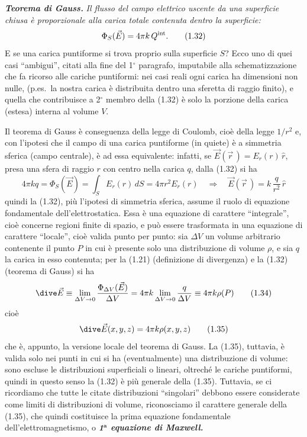 \textbf{\textit{Teorema di Gauss.}} \textit{Il flusso del campo elettrico uscente da una superficie chiusa è proporzionale alla carica totale contenuta dentro la superficie:}
\begin{equation}
\Phi_S(\vec E)=4\pi k\,Q^{\rm int}.
\tag{1.32}
\end{equation}
E se una carica puntiforme si trova proprio sulla superficie $S$? Ecco uno di quei casi ``ambigui'', citati alla fine del 1$^\circ$ paragrafo, imputabile alla schematizzazione che
fa ricorso alle cariche puntiformi: nei casi reali ogni carica ha dimensioni non nulle, (p.es.\ la nostra carica è distribuita dentro una sferetta di raggio finito), e quella che contribuisce a 2$^\circ$ membro della (1.32) è solo la porzione della carica (estesa) interna al volume $V$.

Il teorema di Gauss è conseguenza della legge di Coulomb, cioè della legge $1/r^2$ e, con l'ipotesi che il campo di una carica puntiforme (in quiete) è a simmetria sferica (campo centrale), è ad essa equivalente: infatti, se $\vec E(\vec r\,)=E_r(r)\,\hat r$, presa una sfera di raggio $r$ con centro nella carica $q$, dalla (1.32) si ha
\begin{equation}
4\pi kq=\Phi_S(\vec E)=\int_S E_r(r)\,dS=4\pi r^2E_r(r)\quad\Rightarrow\quad\vec E(\vec r\,)=k\,\frac{q}{r^2}\,\hat r
\tag{1.33}
\end{equation}
quindi la (1.32), più l'ipotesi di simmetria sferica, assume il ruolo di equazione fondamentale dell'elettrostatica. Essa è una equazione di carattere ``integrale'', cioè concerne regioni finite di spazio, e può essere trasformata in una equazione di carattere ``locale'', cioè valida punto per punto: sia $\Delta V$ un volume arbitrario contenente il punto $P$ in cui è presente solo una distribuzione di volume $\rho$, e sia $q$ la carica in esso contenuta; per la (1.21) (definizione di divergenza) e la (1.32) (teorema di Gauss) si ha
\begin{equation}
\dive\vec E\equiv\lim_{\Delta V\to0}\frac{\Phi_{\Delta V}(\vec E)}{\Delta V}=4\pi k\lim_{\Delta V\to0}\frac{q}{\Delta V}\equiv4\pi k\rho(P)
\tag{1.34}
\end{equation}
cioè
\begin{equation}
\dive\vec E(x,y,z)=4\pi k\rho(x,y,z)
\tag{1.35}
\end{equation}
che è, appunto, la versione locale del teorema di Gauss. La (1.35), tuttavia, è valida solo nei punti in cui si ha (eventualmente) una distribuzione di volume: sono escluse le distribuzioni superficiali o lineari, oltreché le cariche puntiformi, quindi in questo senso la (1.32) è più generale della (1.35). Tuttavia, se ci ricordiamo che tutte le citate distribuzioni ``singolari'' debbono essere considerate come limiti di distribuzioni di volume, riconosciamo il carattere generale della (1.35), che quindi costituisce la prima equazione fondamentale dell'elettromagnetismo, o \textbf{\textit{1$^{\mathbf{a}}$ equazione di Maxwell.}}

